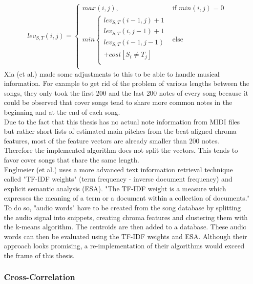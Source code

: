 \begin{equation} \label{eq:tr1}
lev_{S,T}(i, j) = \begin{cases}
max(i, j), &\text{if } min(i, j) = 0\\
min \begin{cases}
lev_{S,T}(i-1, j) + 1\\
lev_{S,T}(i, j-1) + 1\\
lev_{S,T}(i-1, j-1)\\
+cost[S_i \neq T_j]\\
\end{cases} &\text{else} \\
\end{cases}
\end{equation}
Xia (et al.) made some adjustments to this to be able to handle musical information.\cite[pp. 7ff]{chroma4} For example to get rid of the problem of various lengths between the songs, they only took the first 200 and the last 200 notes of every song because it could be observed that cover songs tend to share more common notes in the beginning and at the end of each song.\\
Due to the fact that this thesis has no actual note information from MIDI files but rather short lists of estimated main pitches from the beat aligned chroma features, most of the feature vectors are already smaller than 200 notes. Therefore the implemented algorithm does not split the vectors. This tends to favor cover songs that share the same length. 
\ \\
Englmeier (et al.) uses a more advanced text information retrieval technique called "TF-IDF weights" (term frequency - inverse document frequency) and explicit semantic analysis (ESA). "The TF-IDF weight is a measure which expresses the meaning of a term or a document within a collection of documents." \cite[p. 186]{chroma1}
To do so, "audio words" have to be created from the song database by splitting the audio signal into snippets, creating chroma features and clustering them with the k-means algorithm. The centroids are then added to a database. These audio words can then be evaluated using the TF-IDF weights and ESA.
Although their approach looks promising, a re-implementation of their algorithms would exceed the frame of this thesis.

\subsubsection{Cross-Correlation}\label{crosscorrsec}

